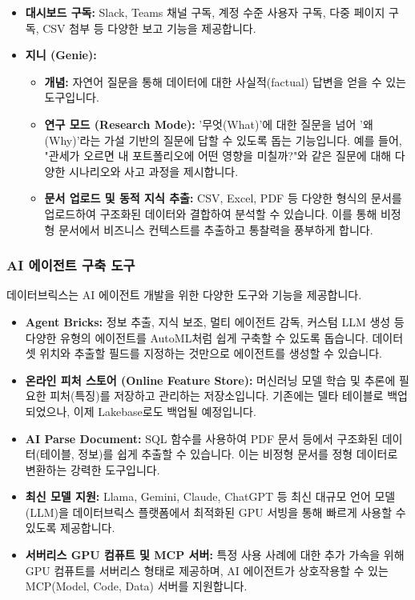 \documentclass[11pt,a4paper]{article}
\begin{document}
\begin{itemize}
    \item \textbf{대시보드 구독:} Slack, Teams 채널 구독, 계정 수준 사용자 구독, 다중 페이지 구독, CSV 첨부 등 다양한 보고 기능을 제공합니다.
    \item \textbf{지니 (Genie):}
    \begin{itemize}
        \item \textbf{개념:} 자연어 질문을 통해 데이터에 대한 사실적(factual) 답변을 얻을 수 있는 도구입니다.
        \item \textbf{연구 모드 (Research Mode):} '무엇(What)'에 대한 질문을 넘어 '왜(Why)'라는 가설 기반의 질문에 답할 수 있도록 돕는 기능입니다. 예를 들어, "관세가 오르면 내 포트폴리오에 어떤 영향을 미칠까?"와 같은 질문에 대해 다양한 시나리오와 사고 과정을 제시합니다.
        \item \textbf{문서 업로드 및 동적 지식 추출:} CSV, Excel, PDF 등 다양한 형식의 문서를 업로드하여 구조화된 데이터와 결합하여 분석할 수 있습니다. 이를 통해 비정형 문서에서 비즈니스 컨텍스트를 추출하고 통찰력을 풍부하게 합니다.
    \end{itemize}
\end{itemize}

\subsubsection{AI 에이전트 구축 도구}
데이터브릭스는 AI 에이전트 개발을 위한 다양한 도구와 기능을 제공합니다.

\begin{itemize}
    \item \textbf{Agent Bricks:} 정보 추출, 지식 보조, 멀티 에이전트 감독, 커스텀 LLM 생성 등 다양한 유형의 에이전트를 AutoML처럼 쉽게 구축할 수 있도록 돕습니다. 데이터셋 위치와 추출할 필드를 지정하는 것만으로 에이전트를 생성할 수 있습니다.
    \item \textbf{온라인 피처 스토어 (Online Feature Store):} 머신러닝 모델 학습 및 추론에 필요한 피처(특징)를 저장하고 관리하는 저장소입니다. 기존에는 델타 테이블로 백업되었으나, 이제 Lakebase로도 백업될 예정입니다.
    \item \textbf{AI Parse Document:} SQL 함수를 사용하여 PDF 문서 등에서 구조화된 데이터(테이블, 정보)를 쉽게 추출할 수 있습니다. 이는 비정형 문서를 정형 데이터로 변환하는 강력한 도구입니다.
    \item \textbf{최신 모델 지원:} Llama, Gemini, Claude, ChatGPT 등 최신 대규모 언어 모델(LLM)을 데이터브릭스 플랫폼에서 최적화된 GPU 서빙을 통해 빠르게 사용할 수 있도록 제공합니다.
    \item \textbf{서버리스 GPU 컴퓨트 및 MCP 서버:} 특정 사용 사례에 대한 추가 가속을 위해 GPU 컴퓨트를 서버리스 형태로 제공하며, AI 에이전트가 상호작용할 수 있는 MCP(Model, Code, Data) 서버를 지원합니다.
\end{itemize}
\end{document}
